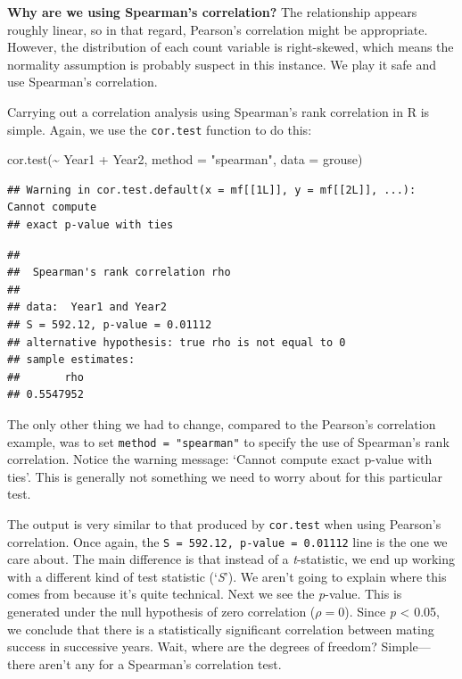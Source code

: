 \documentclass[
]{book}
\newenvironment{Shaded}{\begin{snugshade}}{\end{snugshade}}
\newcommand{\AttributeTok}[1]{\textcolor[rgb]{0.77,0.63,0.00}{#1}}
\newcommand{\FunctionTok}[1]{\textcolor[rgb]{0.00,0.00,0.00}{#1}}
\newcommand{\NormalTok}[1]{#1}
\newcommand{\SpecialCharTok}[1]{\textcolor[rgb]{0.00,0.00,0.00}{#1}}
\newcommand{\StringTok}[1]{\textcolor[rgb]{0.31,0.60,0.02}{#1}}
\begin{document}
\textbf{Why are we using Spearman's correlation?} The relationship appears roughly linear, so in that regard, Pearson's correlation might be appropriate. However, the distribution of each count variable is right-skewed, which means the normality assumption is probably suspect in this instance. We play it safe and use Spearman's correlation.

Carrying out a correlation analysis using Spearman's rank correlation in R is simple. Again, we use the \texttt{cor.test} function to do this:

\begin{Shaded}
\begin{Highlighting}[]
\FunctionTok{cor.test}\NormalTok{(}\SpecialCharTok{\textasciitilde{}}\NormalTok{ Year1 }\SpecialCharTok{+}\NormalTok{ Year2, }\AttributeTok{method =} \StringTok{"spearman"}\NormalTok{, }\AttributeTok{data =}\NormalTok{ grouse)}
\end{Highlighting}
\end{Shaded}

\begin{verbatim}
## Warning in cor.test.default(x = mf[[1L]], y = mf[[2L]], ...): Cannot compute
## exact p-value with ties
\end{verbatim}

\begin{verbatim}
## 
##  Spearman's rank correlation rho
## 
## data:  Year1 and Year2
## S = 592.12, p-value = 0.01112
## alternative hypothesis: true rho is not equal to 0
## sample estimates:
##       rho 
## 0.5547952
\end{verbatim}

The only other thing we had to change, compared to the Pearson's correlation example, was to set \texttt{method\ =\ "spearman"} to specify the use of Spearman's rank correlation. Notice the warning message: `Cannot compute exact p-value with ties'. This is generally not something we need to worry about for this particular test.

The output is very similar to that produced by \texttt{cor.test} when using Pearson's correlation. Once again, the \texttt{S\ =\ 592.12,\ p-value\ =\ 0.01112} line is the one we care about. The main difference is that instead of a \emph{t}-statistic, we end up working with a different kind of test statistic (`\emph{S}'). We aren't going to explain where this comes from because it's quite technical. Next we see the \emph{p}-value. This is generated under the null hypothesis of zero correlation (\(\rho = 0\)). Since \emph{p} \textless{} 0.05, we conclude that there is a statistically significant correlation between mating success in successive years. Wait, where are the degrees of freedom? Simple---there aren't any for a Spearman's correlation test.
\end{document}
